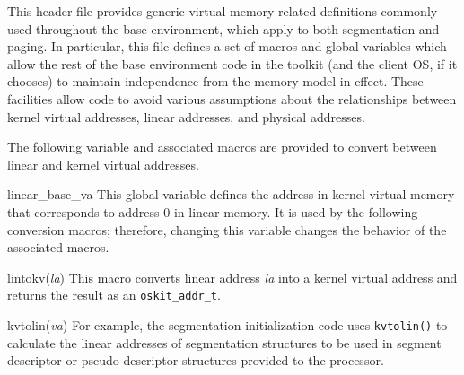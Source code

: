 \label{base-vm}
\begin{apisyn}
\end{apisyn}
\begin{apidesc}
	This header file provides generic virtual memory-related definitions
	commonly used throughout the base environment,
	which apply to both segmentation and paging.
	In particular, this file defines a set of macros and global variables
	which allow the rest of the base environment code in the toolkit
	(and the client OS, if it chooses)
	to maintain independence from the memory model in effect.
	These facilities allow code
	to avoid various assumptions about
	the relationships between kernel virtual addresses,
	linear addresses, and physical addresses.

	The following variable and associated macros
	are provided to convert between linear and kernel virtual addresses.
	\begin{csymlist}
	\item[linear_base_va]		
		This global variable defines
		the address in kernel virtual memory
		that corresponds to address 0 in linear memory.
		It is used by the following conversion macros;
		therefore, changing this variable
		changes the behavior of the associated macros.
	\item[lintokv(\emph{la})]	
		This macro converts linear address \emph{la}
		into a kernel virtual address
		and returns the result as an {\tt oskit_addr_t}.
	\item[kvtolin(\emph{va})]	
		For example,
		the segmentation initialization code uses {\tt kvtolin()}
		to calculate the linear addresses of segmentation structures
		to be used in segment descriptor or pseudo-descriptor structures
		provided to the processor.
	\end{csymlist}


\end{apidesc}
